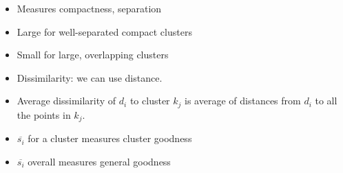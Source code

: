 





\begin{itemize}
\item Measures compactness, separation
\item Large for well-separated compact clusters
\item Small for large, overlapping clusters
\item Dissimilarity: we can use distance.
\item Average dissimilarity of $d_i$ to cluster $k_j$ is average of
  distances from $d_i$ to all the points in $k_j$.
\item $\overline{s_i}$ for a cluster measures cluster goodness
\item $\overline{s_i}$ overall measures general goodness
\end{itemize}


